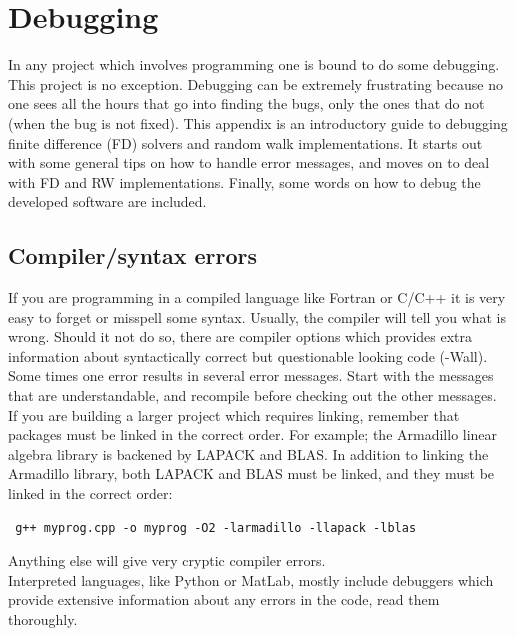 \section{Debugging}\label{debugging}

In any project which involves programming one is bound to do some debugging. This project is no exception. 
Debugging can be extremely frustrating because no one sees all the hours that go into finding the bugs, only the ones that do not (when the bug is not fixed). 
This appendix is an introductory guide to debugging finite difference (FD) solvers and random walk implementations. It starts out with some general tips on how to handle error messages, and moves on to deal with FD and RW implementations. 
Finally, some words on how to debug the developed software are included.

\subsection{Compiler/syntax errors}
If you are programming in a compiled language like Fortran or C/C++ it is very easy to forget or misspell some syntax. 
Usually, the compiler will tell you what is wrong. 
Should it not do so, there are compiler options which provides extra information about syntactically correct but questionable looking code (-Wall). 
Some times one error results in several error messages. 
Start with the messages that are understandable, and recompile before checking out the other messages. \\

\noindent If you are building a larger project which requires linking, remember that packages must be linked in the correct order. 
For example; the Armadillo linear algebra library is backened by LAPACK and BLAS. 
In addition to linking the Armadillo library, both LAPACK and BLAS must be linked, and they must be linked in the correct order: 
\begin{lstlisting}
 g++ myprog.cpp -o myprog -O2 -larmadillo -llapack -lblas
\end{lstlisting}
Anything else will give very cryptic compiler errors. \\

Interpreted languages, like Python or MatLab, mostly include debuggers which provide extensive information about any errors in the code, read them thoroughly.

